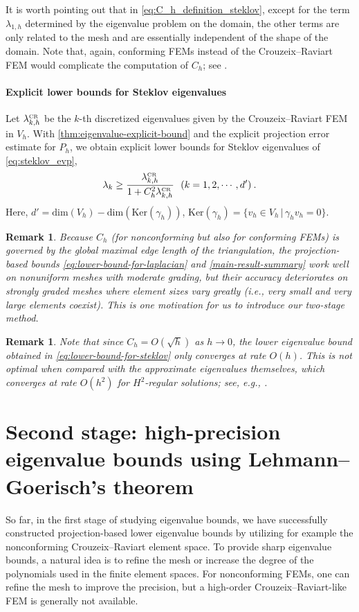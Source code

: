 \documentclass[a4,11pt]{article}
\numberwithin{equation}{section}
\newcommand{\CR}{\mbox{\tiny{CR}}}
\newtheorem{remark}[theorem]{Remark}
\begin{document}
It is worth pointing out that in \cref{eq:C_h_definition_steklov}, except for the term $\lambda_{1,h}$ determined by the eigenvalue problem on the domain, the other terms are only related to the mesh and are essentially independent of the shape of the domain.
{Note that, again, conforming FEMs instead of the
Crouzeix--Raviart FEM would complicate the computation of $C_h$; see \cite{NakanoLiYueLiu+2023}.}

\medskip

\paragraph{Explicit lower bounds for Steklov eigenvalues}
Let $\lambda_{k,h}^{\CR}$ be the $k$-th discretized eigenvalues given by the Crouzeix--Raviart FEM in $V_h$.
With \cref{thm:eigenvalue-explicit-bound} and the explicit projection error estimate for $P_h$, 
we obtain explicit lower bounds for Steklov eigenvalues of \cref{eq:steklov_evp},
\begin{equation}
\label{eq:lower-bound-for-steklov}
\lambda_k \ge  \frac{\lambda_{k,h}^{\CR}}{1+C_h^2 \lambda_{k,h}^{\CR}} ~~( k=1,2,\cdots, {d'})\:.
\end{equation}
Here, ${d'}
=\text{dim}(V_h) - \text{dim}(\text{Ker}(\gamma_h))$, 
$\text{Ker}(\gamma_h) = \{v_h \in {V}_h \,|\, \gamma_h v_h =0\}$.

\begin{remark}
Because $C_h$ (for nonconforming but also for conforming FEMs) is governed by the global maximal edge length of the triangulation, the projection-based bounds \eqref{eq:lower-bound-for-laplacian} and \eqref{main-result-summary} work well on nonuniform meshes with moderate grading, but their accuracy deteriorates on strongly graded meshes where element sizes vary greatly (i.e., very small and very large elements coexist).
This is one motivation for us to introduce our two-stage method.	
\end{remark}
\begin{remark}
\label{remark:sub-optimal-rate-steklov}
Note that since $C_h=O(\sqrt{h})$ as $h\to 0$, the lower eigenvalue bound obtained in
\cref{eq:lower-bound-for-steklov} only converges at rate $O(h)$. This is not
optimal when compared with the approximate eigenvalues themselves, which converges at rate $O(h^2)$ for $H^{2}$-regular solutions; see, e.g., \cite{Yang2010}.
\end{remark}


\section{Second stage: high-precision eigenvalue bounds using Lehmann--Goerisch's theorem}
\label{section:second_stage}
So far, in the first stage of studying eigenvalue bounds, we have successfully constructed projection-based  lower eigenvalue bounds by utilizing for example the nonconforming Crouzeix--Raviart element space.
To provide sharp eigenvalue bounds, a natural idea is to refine the mesh or increase the degree of the polynomials used in the finite element spaces.
For nonconforming FEMs, one can refine the mesh to improve the precision, but a high-order Crouzeix--Raviart-like FEM is generally not available.
\end{document}
